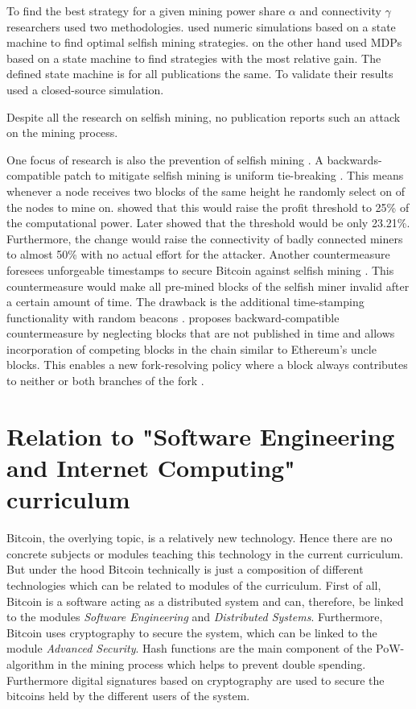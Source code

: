 \documentclass{scrartcl}
\begin{document}
To find the best strategy for a given mining power share $\alpha$ and connectivity $\gamma$ researchers used two methodologies. \cite{gervais2015tampering, nayak2016stubborn} used numeric simulations based on a state machine to find optimal selfish mining strategies. \cite{sapirshtein2016optimal, gervais2016security} on the other hand used MDPs based on a state machine to find strategies with the most relative gain. The defined state machine is for all publications the same. To validate their results \citep{eyal2014majority, sapirshtein2016optimal} used a closed-source simulation.

Despite all the research on selfish mining, no publication reports such an attack on the mining process.

One focus of research is also the prevention of selfish mining \cite{eyal2014majority, billah2015one, solat2016zeroblock, zhang2017publish}. A backwards-compatible patch to mitigate selfish mining is uniform tie-breaking \cite{eyal2014majority}. This means whenever a node receives two blocks of the same height he randomly select on of the nodes to mine on. \citep{eyal2014majority} showed that this would raise the profit threshold to 25\% of the computational power. Later \citep{sapirshtein2016optimal} showed that the threshold would be only 23.21\%. Furthermore, the change would raise the connectivity of badly connected miners to almost 50\% with no actual effort for the attacker. Another countermeasure foresees unforgeable timestamps to secure Bitcoin against selfish mining \citep{billah2015one}. This countermeasure would make all pre-mined blocks of the selfish miner invalid after a certain amount of time. The drawback is the additional time-stamping functionality with random beacons \citep{billah2015one}. \cite{zhang2017publish} proposes backward-compatible countermeasure by neglecting blocks that are not published in time and allows incorporation of competing blocks in the chain similar to Ethereum's uncle blocks\cite{Ethereum}. This enables a new fork-resolving policy where a block always contributes to neither or both branches of the fork \cite{zhang2017publish}.

\section{Relation to "Software Engineering and Internet Computing" curriculum}
Bitcoin, the overlying topic, is a relatively new technology. Hence there are no concrete subjects or modules teaching this technology in the current curriculum. But under the hood Bitcoin technically is just a composition of different technologies which can be related to modules of the curriculum. First of all, Bitcoin is a software acting as a distributed system and can, therefore, be linked to the modules \textit{Software Engineering} and \textit{Distributed Systems}. Furthermore, Bitcoin uses cryptography to secure the system, which can be linked to the module \textit{Advanced Security}. Hash functions are the main component of the PoW-algorithm in the mining process which helps to prevent double spending. Furthermore digital signatures based on cryptography are used to secure the bitcoins held by the different users of the system.
\end{document}
